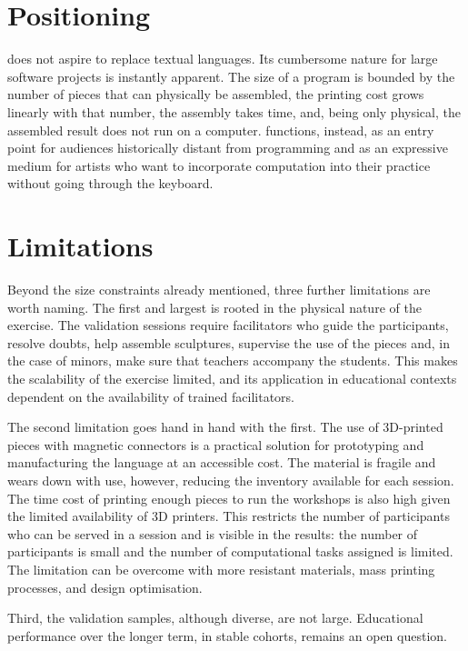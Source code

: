 \section{Positioning}
\label{sec:discussion:positioning}

\sculpt does not aspire to replace textual languages.
Its cumbersome nature for large software projects is instantly apparent.
The size of a program is bounded by the number of pieces that can physically be assembled, the printing cost grows linearly with that number, the assembly takes time, and, being only physical, the assembled result does not run on a computer.
\sculpt functions, instead, as an entry point for audiences historically distant from programming and as an expressive medium for artists who want to incorporate computation into their practice without going through the keyboard.

\section{Limitations}
\label{sec:discussion:limitations}

Beyond the size constraints already mentioned, three further limitations are worth naming.
The first and largest is rooted in the physical nature of the exercise.
The validation sessions require facilitators who guide the participants, resolve doubts, help assemble sculptures, supervise the use of the pieces and, in the case of minors, make sure that teachers accompany the students.
This makes the scalability of the exercise limited, and its application in educational contexts dependent on the availability of trained facilitators.

The second limitation goes hand in hand with the first.
The use of 3D-printed pieces with magnetic connectors is a practical solution for prototyping and manufacturing the language at an accessible cost.
The material is fragile and wears down with use, however, reducing the inventory available for each session.
The time cost of printing enough pieces to run the workshops is also high given the limited availability of 3D printers.
This restricts the number of participants who can be served in a session and is visible in the results: the number of participants is small and the number of computational tasks assigned is limited.
The limitation can be overcome with more resistant materials, mass printing processes, and design optimisation.

Third, the validation samples, although diverse, are not large.
Educational performance over the longer term, in stable cohorts, remains an open question.

\endinput
